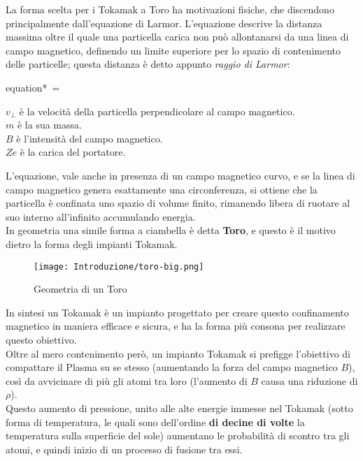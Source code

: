 \noindent
La forma scelta per i Tokamak a Toro ha motivazioni fisiche, che discendono principalmente dall'equazione di Larmor. L'equazione descrive la distanza massima oltre il quale una particella carica non può allontanarsi da una linea di campo magnetico, definendo un limite superiore per lo spazio di contenimento delle particelle; questa distanza è detto appunto \textit{raggio di Larmor}:\\
\begin{vwcol}[widths={0.3,0.7}, sep=8mm, rule=1px]
	\begin{empheq}[box=\mathCalc]{equation*} \label{eq:Larmor}
		{\displaystyle \,\rho ={}}
	\end{empheq}
	\newpage %
	\begin{spacing}{1.25}
		{\footnotesize
			$ {\displaystyle v_{\perp }} $ è la velocità della particella perpendicolare al campo magnetico.\\
			$ {\displaystyle m} $ è la sua massa.\\
			$ {\displaystyle B} $ è l'intensità del campo magnetico.\\
			$ {\displaystyle Ze} $ è la carica del portatore.
		}
	\end{spacing}
\end{vwcol}
\noindent
L'equazione, vale anche in presenza di un campo magnetico curvo, e se la linea di campo magnetico genera esattamente una circonferenza, si ottiene che la particella è confinata uno spazio di volume finito, rimanendo libera di ruotare al suo interno all'infinito accumulando energia.\\
In geometria una simile forma a ciambella è detta \textbf{Toro}, e questo è il motivo dietro la forma degli impianti Tokamak.\vspace{-5mm}
\begin{figure}[H]
	\centering
	\caption[Geometria di un Toro]{Geometria di un Toro}
	\texttt{[image: Introduzione/toro-big.png]}
\end{figure}\vspace{-8mm}
\noindent
In sintesi un Tokamak è un impianto progettato per creare questo confinamento magnetico in maniera efficace e sicura, e ha la forma più consona per realizzare questo obiettivo.\\
Oltre al mero contenimento però, un impianto Tokamak si prefigge l'obiettivo di compattare il Plasma su se stesso (aumentando la forza del campo magnetico $ B $), così da avvicinare di più gli atomi tra loro (l'aumento di $ B $ causa una riduzione di $ \rho $).\\
Questo aumento di pressione, unito alle alte energie immesse nel Tokamak (sotto forma di temperatura, le quali sono dell'ordine \textbf{di decine di volte} la temperatura sulla superficie del sole) aumentano le probabilità di scontro tra gli atomi, e quindi inizio di un processo di fusione tra essi. 

